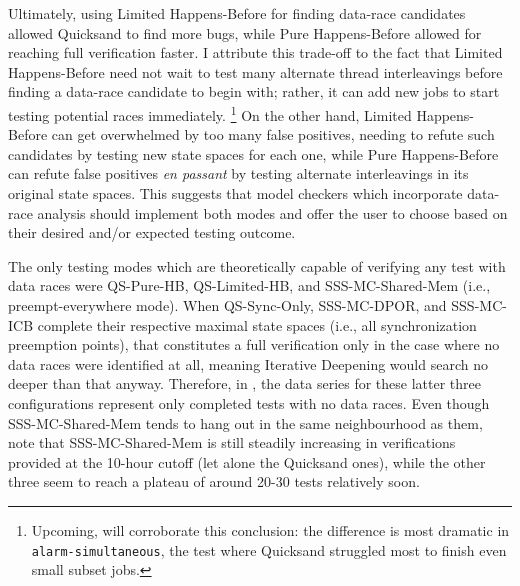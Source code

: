 Ultimately, using Limited Happens-Before for finding data-race candidates allowed Quicksand to find more bugs,
while Pure Happens-Before allowed for reaching full verification faster.
I attribute this trade-off to the fact that
Limited Happens-Before need not wait to test many alternate thread interleavings before
finding a data-race candidate to begin with;
rather, it can add new jobs to start testing potential races immediately.%
\footnote{Upcoming,  will corroborate this conclusion:
the difference is most dramatic in {\tt alarm-\allowbreak{}simultaneous},
the test where Quicksand struggled most to finish even small subset jobs.}
%
On the other hand, Limited Happens-Before can get overwhelmed by too many false positives,
needing to refute such candidates by testing new state spaces for each one,
while Pure Happens-Before can refute false positives {\em en passant}
by testing alternate interleavings in its original state spaces.
This suggests that
model checkers which incorporate data-race analysis should implement both modes
and offer the user to choose based on their desired and/or expected testing outcome.

The only testing modes which are theoretically capable of verifying any test with data races
were QS-Pure-HB, QS-Limited-HB, and SSS-MC-Shared-Mem (i.e., preempt-everywhere mode).
When QS-Sync-Only, SSS-MC-DPOR, and SSS-MC-ICB
complete their respective maximal state spaces (i.e., all synchronization preemption points),
that constitutes a full verification only in the case where no data races were identified at all,
meaning Iterative Deepening would search no deeper than that anyway.
Therefore, in ,
the data series for these latter three configurations
represent only completed tests with no data races.
Even though SSS-MC-Shared-Mem tends to hang out in the same neighbourhood as them,
note that SSS-MC-Shared-Mem is still steadily increasing in verifications provided at the 10-hour cutoff
(let alone the Quicksand ones),
while the other three seem to reach a plateau of around 20-30 tests relatively soon.


